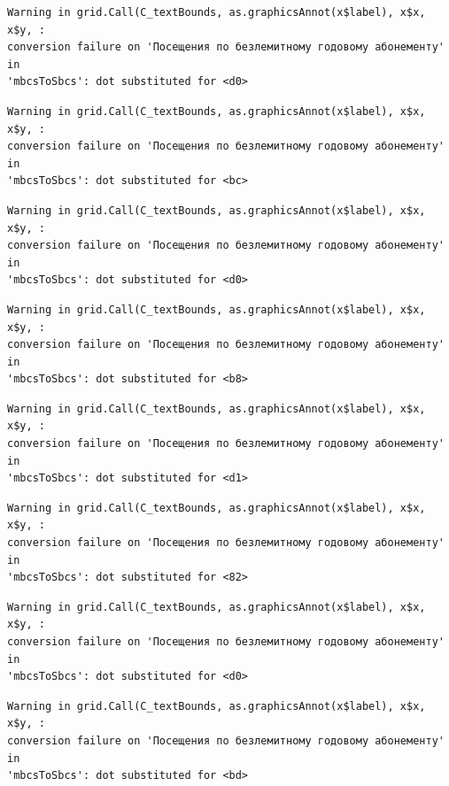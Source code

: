 \documentclass[
  letterpaper,
  DIV=11,
  numbers=noendperiod]{scrartcl}
\begin{document}
\begin{verbatim}
Warning in grid.Call(C_textBounds, as.graphicsAnnot(x$label), x$x, x$y, :
conversion failure on 'Посещения по безлемитному годовому абонементу' in
'mbcsToSbcs': dot substituted for <d0>
\end{verbatim}

\begin{verbatim}
Warning in grid.Call(C_textBounds, as.graphicsAnnot(x$label), x$x, x$y, :
conversion failure on 'Посещения по безлемитному годовому абонементу' in
'mbcsToSbcs': dot substituted for <bc>
\end{verbatim}

\begin{verbatim}
Warning in grid.Call(C_textBounds, as.graphicsAnnot(x$label), x$x, x$y, :
conversion failure on 'Посещения по безлемитному годовому абонементу' in
'mbcsToSbcs': dot substituted for <d0>
\end{verbatim}

\begin{verbatim}
Warning in grid.Call(C_textBounds, as.graphicsAnnot(x$label), x$x, x$y, :
conversion failure on 'Посещения по безлемитному годовому абонементу' in
'mbcsToSbcs': dot substituted for <b8>
\end{verbatim}

\begin{verbatim}
Warning in grid.Call(C_textBounds, as.graphicsAnnot(x$label), x$x, x$y, :
conversion failure on 'Посещения по безлемитному годовому абонементу' in
'mbcsToSbcs': dot substituted for <d1>
\end{verbatim}

\begin{verbatim}
Warning in grid.Call(C_textBounds, as.graphicsAnnot(x$label), x$x, x$y, :
conversion failure on 'Посещения по безлемитному годовому абонементу' in
'mbcsToSbcs': dot substituted for <82>
\end{verbatim}

\begin{verbatim}
Warning in grid.Call(C_textBounds, as.graphicsAnnot(x$label), x$x, x$y, :
conversion failure on 'Посещения по безлемитному годовому абонементу' in
'mbcsToSbcs': dot substituted for <d0>
\end{verbatim}

\begin{verbatim}
Warning in grid.Call(C_textBounds, as.graphicsAnnot(x$label), x$x, x$y, :
conversion failure on 'Посещения по безлемитному годовому абонементу' in
'mbcsToSbcs': dot substituted for <bd>
\end{verbatim}
\end{document}
